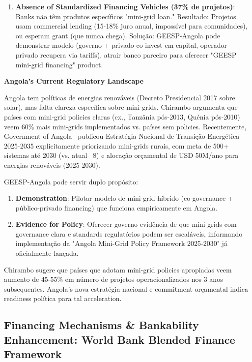 \documentclass[12pt, a4paper]{article}
\begin{document}
\begin{enumerate}
\item \textbf{Absence of Standardized Financing Vehicles (37\% de projetos)}: Banks não têm produtos específicos "mini-grid loan." Resultado: Projetos usam commercial lending (15-18\% juro anual, impossível para comunidades), ou esperam grant (que nunca chega). Solução: GEESP-Angola pode demonstrar modelo (governo + privado co-invest em capital, operador privado recupera via tariffs), atrair banco parceiro para oferecer "GEESP mini-grid financing" product.

\end{enumerate}

\textbf{Angola's Current Regulatory Landscape}

Angola tem políticas de energias renováveis (Decreto Presidencial 2017 sobre solar), mas falta clareza específica sobre mini-grids. Chirambo argumenta que países com mini-grid policies claras (ex., Tanzânia pós-2013, Quénia pós-2010) veem 60\% mais mini-grids implementados vs. países sem policies. Recentemente, Government of Angola~\citep{GovernmentAngola2024} publicou Estratégia Nacional de Transição Energética 2025-2035 explicitamente priorizando mini-grids rurais, com meta de 500+ sistemas até 2030 (vs. atual ~8) e alocação orçamental de USD 50M/ano para energias renováveis (2025-2030).

GEESP-Angola pode servir duplo propósito:
\begin{enumerate}
\item \textbf{Demonstration}: Pilotar modelo de mini-grid híbrido (co-governance + público-privado financing) que funciona empiricamente em Angola.
\item \textbf{Evidence for Policy}: Oferecer governo evidência de que mini-grids com governance clara e standards regulatórios podem ser escaláveis, informando implementação da "Angola Mini-Grid Policy Framework 2025-2030" já oficialmente lançada.
\end{enumerate}

Chirambo sugere que países que adotam mini-grid policies apropiadas veem aumento de 45-55\% em número de projetos operacionalizados nos 3 anos subsequentes. Angola's nova estratégia nacional e commitment orçamental indica readiness política para tal acceleration.

\subsection{Financing Mechanisms \& Bankability Enhancement: World Bank Blended Finance Framework}
\end{document}
